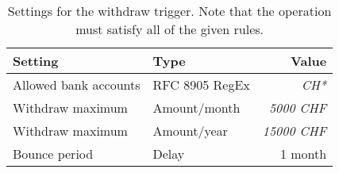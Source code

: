 \begin{table}[h!]
  \caption{Settings for the withdraw trigger. Note that the operation
  must satisfy all of the given rules.} \label{table:kyc:withdraw:settings}
  \begin{tabular}{l|l|r}
    {\bf Setting}            & {\bf Type}         &  {\bf Value} \\ \hline \hline
    Allowed bank accounts    & RFC 8905 RegEx     &  {\em CH*} \\ \hline
    Withdraw maximum         & Amount/month       &  {\em 5000 CHF} \\
    Withdraw maximum         & Amount/year        &  {\em 15000 CHF} \\
    Bounce period            & Delay              &  1 month \\
  \end{tabular}
\end{table}
